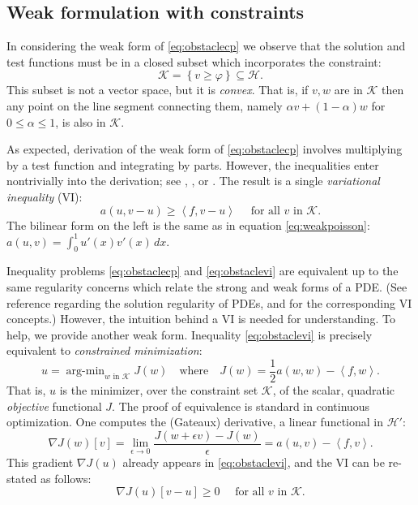 \documentclass[letterpaper,final,12pt,reqno]{amsart}
\theoremstyle{claim}
\newcommand{\eps}{\epsilon}
\newcommand{\grad}{\nabla}
\newcommand{\ip}[2]{\left<#1,#2\right>}
\numberwithin{equation}{section}
\numberwithin{figure}{section}
\numberwithin{table}{section}
\begin{document}
\subsection*{Weak formulation with constraints}  In considering the weak form of \eqref{eq:obstaclecp} we observe that the solution and test functions must be in a closed subset which incorporates the constraint:
\begin{equation}
\mathcal{K} = \left\{v \ge \varphi\right\} \subseteq \mathcal{H}.  \label{eq:Kdefine}
\end{equation}
This subset is not a vector space, but it is \emph{convex}.  That is, if $v,w$ are in $\mathcal{K}$ then any point on the line segment connecting them, namely $\alpha v + (1-\alpha) w$ for $0 \le \alpha \le 1$, is also in $\mathcal{K}$.  

As expected, derivation of the weak form of \eqref{eq:obstaclecp} involves multiplying by a test function and integrating by parts.  However, the inequalities enter nontrivially into the derivation; see \cite[Chapter 12]{Bueler2021}, \cite{JouvetBueler2012}, or \cite{KinderlehrerStampacchia1980}.  The result is a single \emph{variational inequality} (VI):
\begin{equation}
  a(u,v-u) \ge \ip{f}{v-u} \quad \text{ for all } v \text{ in } \mathcal{K}. \label{eq:obstaclevi}
\end{equation}
The bilinear form on the left is the same as in equation \eqref{eq:weakpoisson}: $a(u,v) = \int_0^1 u'(x) v'(x)\,dx$.

Inequality problems \eqref{eq:obstaclecp} and \eqref{eq:obstaclevi} are equivalent up to the same regularity concerns which relate the strong and weak forms of a PDE.  (See reference \cite{Evans2010} regarding the solution regularity of PDEs, and \cite{KinderlehrerStampacchia1980} for the corresponding VI concepts.)  However, the intuition behind a VI is needed for understanding.  To help, we provide another weak form.  Inequality \eqref{eq:obstaclevi} is precisely equivalent to \emph{constrained minimization}:
\newcommand{\argmin}{\mathop{\mathrm{arg\text{-}min}}}
\begin{equation}
  u = \argmin_{w \text{ in } \mathcal{K}} J(w) \quad \text{where} \quad J(w) = \frac{1}{2} a(w,w) - \ip{f}{w}. \label{eq:obstaclemin}
\end{equation}
That is, $u$ is the minimizer, over the constraint set $\mathcal{K}$, of the scalar, quadratic \emph{objective} functional $J$.  The proof of equivalence is standard in continuous optimization.  One computes the (Gateaux) derivative, a linear functional in $\mathcal{H}'$:
\begin{equation}
  \grad J(w)[v] = \lim_{\eps\to 0} \frac{J(w+\eps v) - J(w)}{\eps} = a(u,v) - \ip{f}{v}.  \label{eq:gradobjective}
\end{equation}
This gradient $\nabla J(u)$ already appears in \eqref{eq:obstaclevi}, and the VI can be re-stated as follows:
\begin{equation}
  \nabla J(u)[v-u] \ge 0 \quad \text{ for all } v \text{ in } \mathcal{K}. \label{eq:obstaclevigradient}
\end{equation}
\end{document}

